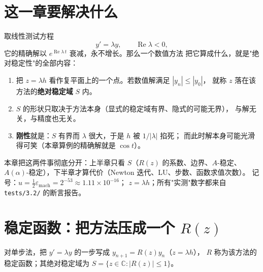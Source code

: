 

\section{这一章要解决什么}

取线性测试方程
\begin{equation}
  y'=\lambda y,\qquad \operatorname{Re}\lambda<0,
  \label{eq:test}
\end{equation}
它的精确解以 $e^{\operatorname{Re}\lambda\, t}$ 衰减，永不增长。那么一个数值方法
把它算成什么，就是"绝对稳定性"的全部内容：

\begin{enumerate}
  \item 把 $z=\lambda h$ 看作复平面上的一个点。若数值解满足 $|y_n|\le|y_0|$，
        就称 $z$ 落在该方法的\textbf{绝对稳定域} $S$ 内。
  \item $S$ 的形状只取决于方法本身（显式的稳定域有界、隐式的可能无界），
        与解无关，与精度也无关。
  \item \textbf{刚性}就是：$S$ 有界而 $\lambda$ 很大，于是 $h$ 被 $1/|\lambda|$ 掐死；
        而此时解本身可能光滑得可笑（本章算例的精确解就是 $\cos t$）。
\end{enumerate}

本章把这两件事彻底分开：上半章只看 $S$（$R(z)$ 的系数、边界、$A$-稳定、
$A(\alpha)$-稳定），下半章才算代价（Newton 迭代、LU、步数、函数求值次数）。
记号：$u=\tfrac12\varepsilon_{\text{mach}}=2^{-53}\approx1.11\times10^{-16}$；
$z=\lambda h$；所有"实测"数字都来自 \texttt{tests/3.2/} 的断言报告。

\section{稳定函数：把方法压成一个 $R(z)$}

\begin{definition}[稳定函数]
对单步法，把 $y'=\lambda y$ 的一步写成 $y_{n+1}=R(z)y_n$（$z=\lambda h$），
$R$ 称为该方法的稳定函数；其绝对稳定域为
$S=\{z\in\mathbb{C}:|R(z)|\le1\}$。
\end{definition}


